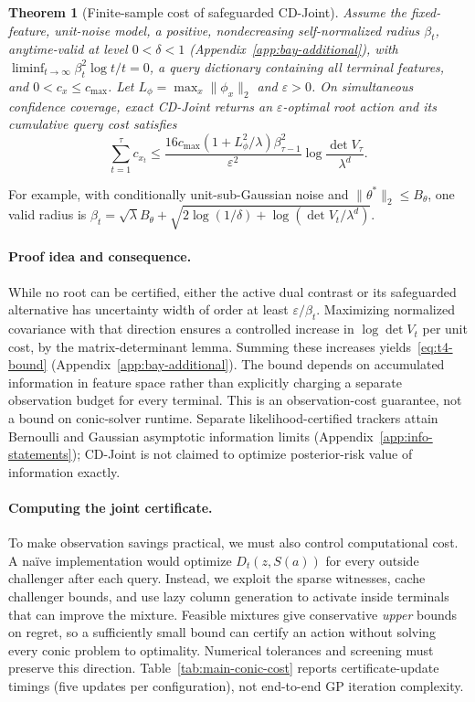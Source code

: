 \documentclass{article}
\theoremstyle{plain}
\newtheorem{theorem}{Theorem}[section]
\theoremstyle{definition}
\begin{document}
\begin{theorem}[Finite-sample cost of safeguarded CD-Joint]
\label{thm:t4-finite-sample}
Assume the fixed-feature, unit-noise model, a positive,
nondecreasing self-normalized radius $\beta_t$, anytime-valid at
level $0<\delta<1$ (Appendix~\ref{app:bay-additional}), with
$\liminf_{t\to\infty}\beta_t^2\log t/t=0$, a query dictionary
containing all terminal features, and $0<c_x\le c_{\max}$.
Let $L_\phi=\max_x\|\phi_x\|_2$ and $\varepsilon>0$.
On simultaneous confidence coverage, exact CD-Joint returns
an $\varepsilon$-optimal root action and its cumulative
query cost satisfies
\begin{equation}
 \sum_{t=1}^{\tau}c_{x_t}\le
 \frac{16c_{\max}(1+L_\phi^2/\lambda)\beta_{\tau-1}^{2}}
 {\varepsilon^2}
 \log\frac{\det V_\tau}{\lambda^d}.
 \label{eq:t4-bound}
\end{equation}
\end{theorem}
For example, with conditionally unit-sub-Gaussian noise and
$\|\theta^*\|_2\le B_\theta$, one valid radius is
$\beta_t=\sqrt\lambda B_\theta+
\sqrt{2\log(1/\delta)+\log(\det V_t/\lambda^d)}$.

\paragraph{Proof idea and consequence.}
While no root can be certified, either the active dual contrast
or its safeguarded alternative has uncertainty width of order
at least $\varepsilon/\beta_t$. Maximizing normalized covariance
with that direction ensures a controlled increase in
$\log\det V_t$ per unit cost, by the matrix-determinant lemma.
Summing these increases yields~\eqref{eq:t4-bound}
(Appendix~\ref{app:bay-additional}).
The bound depends on accumulated information in feature space
rather than explicitly charging a separate observation budget
for every terminal. This is an observation-cost guarantee,
not a bound on conic-solver runtime. Separate likelihood-certified
trackers attain Bernoulli and Gaussian asymptotic information
limits (Appendix~\ref{app:info-statements}); CD-Joint is not
claimed to optimize posterior-risk value of information exactly.

\paragraph{Computing the joint certificate.}
To make observation savings practical, we must also control
computational cost. A na\"ive implementation would optimize
$D_t(z,S(a))$ for every outside challenger after each query.
Instead, we exploit the sparse witnesses, cache challenger
bounds, and use lazy column generation to activate inside
terminals that can improve the mixture. Feasible mixtures give
conservative \emph{upper} bounds on regret, so a sufficiently
small bound can certify an action without solving every conic
problem to optimality. Numerical tolerances and screening must
preserve this direction. Table~\ref{tab:main-conic-cost} reports
certificate-update timings (five updates per configuration),
not end-to-end GP iteration complexity.
\end{document}
